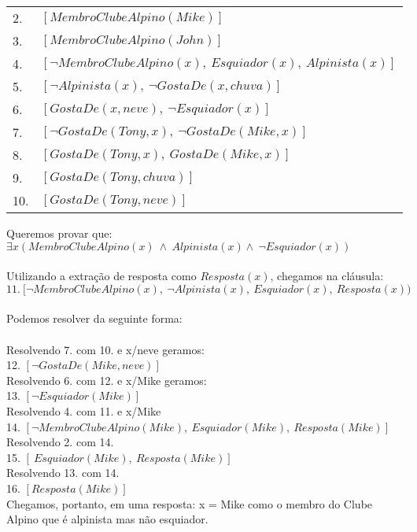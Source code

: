 \documentclass[12pt]{article}
\begin{document}
\begin{itemize}
\begin{itemize}
\begin{center}
\begin{tabular}{l|l}
						2. & $[MembroClubeAlpino(Mike)]$\\
						3. & $[MembroClubeAlpino(John)]$\\
						4. & $[\neg MembroClubeAlpino(x), \ Esquiador(x), \ Alpinista(x)] $ \\
						5. & $[\neg Alpinista(x), \ \neg GostaDe(x, chuva)] $\\
						6. & $[GostaDe(x, neve), \  \neg Esquiador(x)]$\\
						7. & $[\neg GostaDe(Tony, x), \  \neg GostaDe(Mike, x)]$\\
						8. & $[GostaDe(Tony, x), \  GostaDe(Mike, x)]$\\
						9. & $[GostaDe(Tony, chuva)]$\\
						10. & $[GostaDe(Tony, neve)]$\\			
					\end{tabular}
				\end{center}
				Queremos provar que:\\
				$\exists x (MembroClubeAlpino(x) \ \wedge \ Alpinista(x) \wedge \  
				\neg Esquiador(x))$\\ \\
				Utilizando a extração de resposta como $Resposta(x)$, chegamos na cláusula:\\
				$11. \ [\neg MembroClubeAlpino(x), \  \neg Alpinista(x),  \ Esquiador(x),
				\ Resposta(x))$\\ \\
			Podemos resolver da seguinte forma:\\ \\
			 Resolvendo 7. com 10. e x/neve geramos:\\
			12. $[\neg GostaDe(Mike, neve)]$\\
	
			Resolvendo 6. com 12. e x/Mike geramos:\\
			13. $[\neg Esquiador(Mike)]$\\
			
			Resolvendo 4. com 11. e x/Mike\\
			14. $ [\neg MembroClubeAlpino(Mike),  \ Esquiador(Mike), \ Resposta(Mike)]$\\
			
			Resolvendo 2. com 14.\\
			15. $ [\ Esquiador(Mike), \ Resposta(Mike)]$\\
			
			Resolvendo 13. com 14.\\
			16. $ [Resposta(Mike)]$\\

			Chegamos, portanto, em uma resposta: x = Mike como o
			membro do Clube Alpino que é alpinista mas não esquiador.
			\end{itemize}
	\end{itemize}
\end{document}
